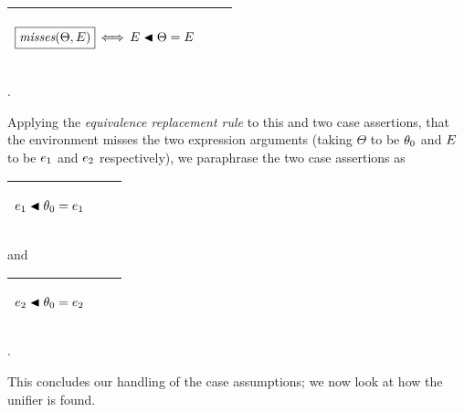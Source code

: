 \documentclass[runningheads]{llncs}
\DeclareMathOperator{\uiff}{\iff}
\begin{document}
\begin{center}
  \begin{tabular}{|m{}|m{}||m{}|}
\hline
\begin{center}
\[ \boxed{\misses(\Theta, \var{E})} \uiff \var{E} \apply \Theta = \var{E} \]\hspace{1cm} 
 \hspace{1cm} 
\end{center}& &  \\  \hline
\end{tabular}.
\end{center}
Applying the \emph{equivalence replacement rule} to this and  two case assertions, that the environment misses the two expression arguments (taking $\Theta$ to be  $\theta_{0}$ and $E$ to be $e_{1}$ and $e_{2}$ respectively), we paraphrase the two case assertions as
\begin{center}
  \begin{tabular}{|m{}|m{}||m{}|}
\hline
\begin{center}
{$e_{1} \blacktriangleleft \theta_{0} = e_{1} $}\hspace{1cm} 
 \hspace{1cm} 
\end{center}& &  \\  \hline
\end{tabular}
\end{center}
and
\begin{center}
  \begin{tabular}{|m{}|m{}||m{}|}
\hline
\begin{center}
{$e_{2} \blacktriangleleft \theta_{0} = e_{2} $}\hspace{1cm} 
 \hspace{1cm} 
\end{center}& &  \\  \hline
\end{tabular}.
\end{center}
This concludes our handling of the case assumptions; we now look at how the unifier is found.
\end{document}
